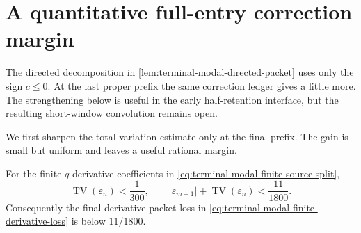 \section{A quantitative full-entry correction margin}
\label{sec:terminal-modal-entry-correction-margin}

The directed decomposition in
\cref{lem:terminal-modal-directed-packet} uses only the sign $c\le0$.
At the last proper prefix the same correction ledger gives a little more.
The strengthening below is useful in the early half-retention interface, but
the resulting short-window convolution remains open.

We first sharpen the total-variation estimate only at the final prefix.  The
gain is small but uniform and leaves a useful rational margin.

\begin{lemma}
\label{lem:terminal-modal-final-source-variation}
For the finite-$q$ derivative coefficients in
\eqref{eq:terminal-modal-finite-source-split},
\begin{equation}
 \operatorname{TV}(\varepsilon_n)<\frac1{300},
 \qquad
 |\varepsilon_{m-1}|+\operatorname{TV}(\varepsilon_n)
 <\frac{11}{1800}.
 \label{eq:terminal-modal-final-source-variation}
\end{equation}
Consequently the final derivative-packet loss in
\eqref{eq:terminal-modal-finite-derivative-loss} is below $11/1800$.
\end{lemma}

